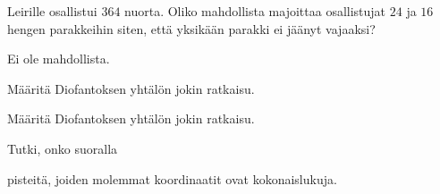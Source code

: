 \begin{tehtava}
    Leirille osallistui $364$ nuorta. Oliko mahdollista majoittaa osallistujat $24$ ja $16$ hengen parakkeihin siten, että yksikään parakki ei jäänyt vajaaksi?
    
    \begin{vastaus}
        Ei ole mahdollista.
    \end{vastaus}
    
\end{tehtava}

\begin{tehtava}
    Määritä Diofantoksen yhtälön jokin ratkaisu.
    
    \begin{alakohdat}
    \end{alakohdat}

    \begin{vastaus}
        \begin{alakohdat}
        \end{alakohdat}
    \end{vastaus}
    
\end{tehtava}

\begin{tehtava}
    Määritä Diofantoksen yhtälön jokin ratkaisu.
    
    \begin{alakohdat}
    \end{alakohdat}

    \begin{vastaus}
        \begin{alakohdat}
        \end{alakohdat}
    \end{vastaus}
    
\end{tehtava}

\begin{tehtava}
    Tutki, onko suoralla
    \begin{alakohdat}
    \end{alakohdat}
    pisteitä, joiden molemmat koordinaatit ovat kokonaislukuja.

    \begin{vastaus}
        \begin{alakohdat}
        \end{alakohdat}
    \end{vastaus}
    
\end{tehtava}

